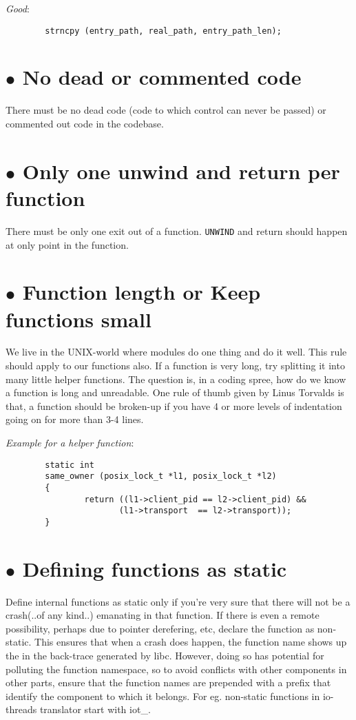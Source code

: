 \documentclass{article}[12pt]
\begin{document}
\textsl{Good}:

\begin{verbatim}
        strncpy (entry_path, real_path, entry_path_len);
\end{verbatim}

\section*{$\bullet$ No dead or commented code}
There must be no dead code (code to which control can never be passed) or
commented out code in the codebase.

\section*{$\bullet$ Only one unwind and return per function}
There must be only one exit out of a function. \texttt{UNWIND} and return
should happen at only point in the function.

\section*{$\bullet$ Function length or Keep functions small}
We live in the UNIX-world where modules do one thing and do it well.
This rule should apply to our functions also. If a function is very long, try splitting it
into many little helper functions. The question is, in a coding
spree, how do we know a function is long and unreadable. One rule of
thumb given by Linus Torvalds is that, a function should be broken-up
if you have 4 or more levels of indentation going on for more than 3-4
lines.

\vspace{2ex}
\textsl{Example for a helper function}:
\begin{verbatim}
        static int
        same_owner (posix_lock_t *l1, posix_lock_t *l2)
        {
                return ((l1->client_pid == l2->client_pid) &&
                       (l1->transport  == l2->transport));
        }
\end{verbatim}

\section*{$\bullet$ Defining functions as static}
Define internal functions as static only if you're
very sure that there will not be a crash(..of any kind..) emanating in
that function. If there is even a remote possibility, perhaps due to
pointer derefering, etc, declare the function as non-static. This
ensures that when a crash does happen, the function name shows up the
in the back-trace generated by libc. However, doing so has potential
for polluting the function namespace, so to avoid conflicts with other
components in other parts, ensure that the function names are
prepended with a prefix that identify the component to which it
belongs. For eg. non-static functions in io-threads translator start
with iot\_.
\end{document}
